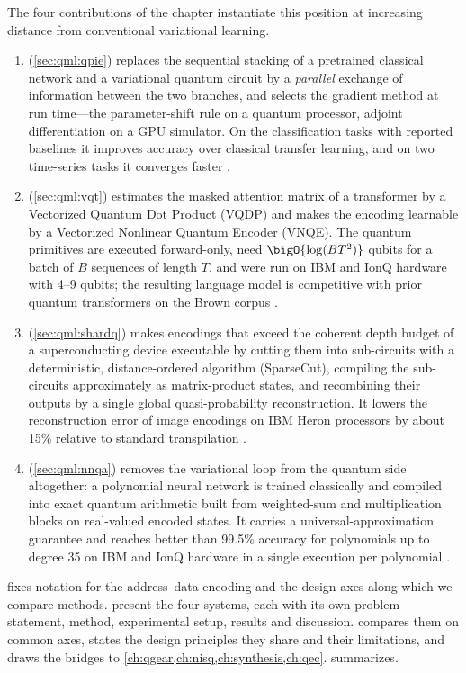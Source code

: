The four contributions of the chapter instantiate this position at increasing distance from conventional variational learning.
\begin{enumerate}
\item \qpie{} (\cref{sec:qml:qpie}) replaces the sequential stacking of a pretrained classical network and a variational quantum circuit by a \emph{parallel} exchange of information between the two branches, and selects the gradient method at run time---the parameter-shift rule on a quantum processor, adjoint differentiation on a GPU simulator. On the classification tasks with reported baselines it improves accuracy over classical transfer learning, and on two time-series tasks it converges faster \cite{guo2025qpie}.
\item \vqt{} (\cref{sec:qml:vqt}) estimates the masked attention matrix of a transformer by a Vectorized Quantum Dot Product (VQDP) and makes the encoding learnable by a Vectorized Nonlinear Quantum Encoder (VNQE). The quantum primitives are executed forward-only, need $\bigO{\log (BT^2)}$ qubits for a batch of $B$ sequences of length $T$, and were run on IBM and IonQ hardware with 4--9 qubits; the resulting language model is competitive with prior quantum transformers on the Brown corpus \cite{guo2025vqt}.
\item \shardq{} (\cref{sec:qml:shardq}) makes encodings that exceed the coherent depth budget of a superconducting device executable by cutting them into sub-circuits with a deterministic, distance-ordered algorithm (SparseCut), compiling the sub-circuits approximately as matrix-product states, and recombining their outputs by a single global quasi-probability reconstruction. It lowers the reconstruction error of image encodings on IBM Heron processors by about 15\% relative to standard transpilation \cite{guo2025shardq}.
\item \nnqa{} (\cref{sec:qml:nnqa}) removes the variational loop from the quantum side altogether: a polynomial neural network is trained classically and compiled into exact quantum arithmetic built from weighted-sum and multiplication blocks on real-valued encoded states. It carries a universal-approximation guarantee and reaches better than 99.5\% accuracy for polynomials up to degree 35 on IBM and IonQ hardware in a single execution per polynomial \cite{guo2026nnqa}.
\end{enumerate}

 fixes notation for the address--data encoding and the design axes along which we compare methods.  present the four systems, each with its own problem statement, method, experimental setup, results and discussion.  compares them on common axes, states the design principles they share and their limitations, and draws the bridges to \cref{ch:qgear,ch:nisq,ch:synthesis,ch:qec}.  summarizes.

